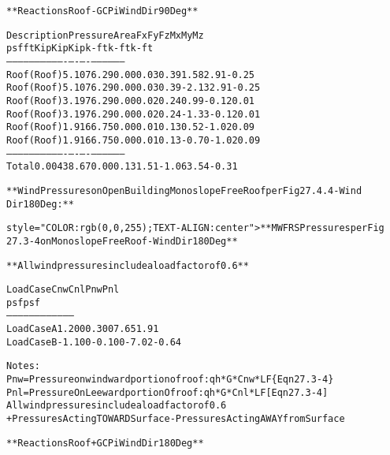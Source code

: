 \documentclass[12pt,notitle,letterpaper]{report}
\renewenvironment{quote}
  {\small\list{}{\rightmargin=0cm \leftmargin=0cm}%
   \item\relax}
  {\endlist}
\begin{document}
\begin{quote}
\begin{alltt}
**Reactions Roof -GCPi Wind Dir 90 Deg**



         Description   Pressure    Area     Fx     Fy      Fz      Mx       My       Mz
                         psf        ft     Kip    Kip     Kip     k-ft     k-ft     k-ft
         -----------   --------   ------   ----   ----    ----    -----    -----    -----
         Roof (Roof)       5.10    76.29   0.00   0.03    0.39     1.58     2.91    -0.25
         Roof (Roof)       5.10    76.29   0.00   0.03    0.39    -2.13     2.91    -0.25
         Roof (Roof)       3.19    76.29   0.00   0.02    0.24     0.99    -0.12     0.01
         Roof (Roof)       3.19    76.29   0.00   0.02    0.24    -1.33    -0.12     0.01
         Roof (Roof)       1.91    66.75   0.00   0.01    0.13     0.52    -1.02     0.09
         Roof (Roof)       1.91    66.75   0.00   0.01    0.13    -0.70    -1.02     0.09
         -----------   --------   ------   ----   ----    ----    -----    -----    -----
         Total             0.00   438.67   0.00   0.13    1.51    -1.06     3.54    -0.31



**Wind Pressures on Open Building Monoslope Free Roof per Fig 27.4.4 - Wind
Dir 180 Deg:**


style="COLOR: rgb(0,0,255); TEXT-ALIGN: center"> **MWFRS Pressures per Fig
27.3-4 on Monoslope Free Roof - Wind Dir 180 Deg**

**All wind pressures include a load factor of 0.6**



          Load Case             Cnw              Cnl              Pnw             Pnl
                                                                  psf             psf
         -----------           ------           ------           -----           -----
         Load Case A            1.200            0.300            7.65            1.91
         Load Case B           -1.100           -0.100           -7.02           -0.64



       Notes:
       Pnw   = Pressure on windward portion of roof:  qh*G*Cnw*LF    \{Eqn 27.3-4\}
       Pnl   = Pressure On Leeward portion Of roof:   qh*G*Cnl*LF    [Eqn 27.3-4]
       All wind pressures include a load factor of 0.6
       + Pressures Acting TOWARD Surface          - Pressures Acting AWAY from Surface



**Reactions Roof +GCPi Wind Dir 180 Deg**




\end{alltt}
\end{quote}
\end{document}
